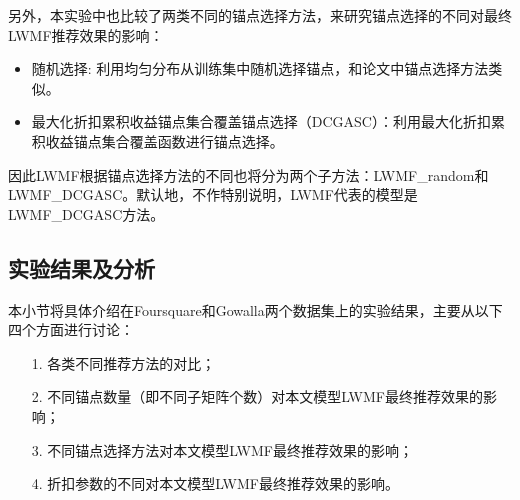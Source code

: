 另外，本实验中也比较了两类不同的锚点选择方法，来研究锚点选择的不同对最终LWMF推荐效果的影响：
\begin{itemize}
	\item 随机选择: 利用均匀分布从训练集中随机选择锚点，和论文\cite{lee2013local,lee2014local}中锚点选择方法类似。
	\item 最大化折扣累积收益锚点集合覆盖锚点选择（DCGASC）：利用最大化折扣累积收益锚点集合覆盖函数进行锚点选择。
\end{itemize}

因此LWMF根据锚点选择方法的不同也将分为两个子方法：{LWMF\_random}和{LWMF\_DCGASC}。默认地，不作特别说明，LWMF代表的模型是{LWMF\_DCGASC}方法。

\subsection{实验结果及分析}
本小节将具体介绍在Foursquare和Gowalla两个数据集上的实验结果，主要从以下四个方面进行讨论：
\begin{itemize}
	\item[1.]   各类不同推荐方法的对比；
	\item[2.]  不同锚点数量（即不同子矩阵个数）对本文模型LWMF最终推荐效果的影响；
	\item[3.]  不同锚点选择方法对本文模型LWMF最终推荐效果的影响；
	\item[4.]  折扣参数的不同对本文模型LWMF最终推荐效果的影响。
\end{itemize}

